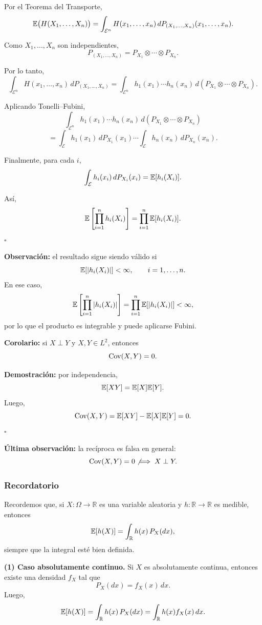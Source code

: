 Por el Teorema del Transporte,
\[
\mathbb{E}\big(H(X_1,\dots,X_n)\big)
=
\int_{\mathcal{E}^n} H(x_1,\dots,x_n)\,dP_{(X_1,\dots,X_n)}(x_1,\dots,x_n).
\]

Como $X_1,\dots,X_n$ son independientes,
\[
P_{(X_1,\dots,X_n)}
=
P_{X_1}\otimes\cdots\otimes P_{X_n}.
\]

Por lo tanto,
\[
\int_{\mathcal{E}^n} H(x_1,\dots,x_n)\,dP_{(X_1,\dots,X_n)}
=
\int_{\mathcal{E}^n} h_1(x_1)\cdots h_n(x_n)\,d(P_{X_1}\otimes\cdots\otimes P_{X_n}).
\]

Aplicando Tonelli--Fubini,
\[
\int_{\mathcal{E}^n} h_1(x_1)\cdots h_n(x_n)\,d(P_{X_1}\otimes\cdots\otimes P_{X_n})
\]
\[
=
\int_{\mathcal{E}} h_1(x_1)\,dP_{X_1}(x_1)\cdots
\int_{\mathcal{E}} h_n(x_n)\,dP_{X_n}(x_n).
\]

Finalmente, para cada $i$,
\[
\int_{\mathcal{E}} h_i(x_i)\,dP_{X_i}(x_i)=\mathbb{E}[h_i(X_i)].
\]

Así,
\[
\mathbb{E}\left[\prod_{i=1}^n h_i(X_i)\right]
=
\prod_{i=1}^n \mathbb{E}[h_i(X_i)].
\]
\hfill $\square$

\medskip

\noindent
\textbf{Observación:} el resultado sigue siendo válido si
\[
\mathbb{E}[|h_i(X_i)|]<\infty,
\qquad i=1,\dots,n.
\]
En ese caso,
\[
\mathbb{E}\left[\prod_{i=1}^n |h_i(X_i)|\right]
=
\prod_{i=1}^n \mathbb{E}[|h_i(X_i)|]
<\infty,
\]
por lo que el producto es integrable y puede aplicarse Fubini.

\medskip

\noindent
\textbf{Corolario:} si $X\perp Y$ y $X,Y\in L^2$, entonces
\[
\mathrm{Cov}(X,Y)=0.
\]

\textbf{Demostración:} por independencia,
\[
\mathbb{E}[XY]=\mathbb{E}[X]\mathbb{E}[Y].
\]
Luego,
\[
\mathrm{Cov}(X,Y)=\mathbb{E}[XY]-\mathbb{E}[X]\mathbb{E}[Y]=0.
\]
\hfill $\square$

\medskip

\noindent
\textbf{Última observación:} la recíproca es falsa en general:
\[
\mathrm{Cov}(X,Y)=0 \not\implies X\perp Y.
\]

\subsubsection*{Recordatorio}

Recordemos que, si $X:\Omega\to\mathbb{R}$ es una variable aleatoria y $h:\mathbb{R}\to\mathbb{R}$ es medible, entonces
\[
\mathbb{E}[h(X)] = \int_{\mathbb{R}} h(x)\,P_X(dx),
\]
siempre que la integral esté bien definida.

\medskip

\noindent
\textbf{(1) Caso absolutamente continuo.}  
Si $X$ es absolutamente continua, entonces existe una densidad $f_X$ tal que
\[
P_X(dx)=f_X(x)\,dx.
\]
Luego,
\[
\mathbb{E}[h(X)]
=
\int_{\mathbb{R}} h(x)\,P_X(dx)
=
\int_{\mathbb{R}} h(x)f_X(x)\,dx.
\]

